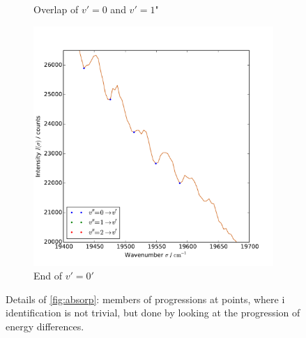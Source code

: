 \begin{figure}
\begin{subfigure}[b]{\picwidth}
        \caption{Overlap of $v'=0$ and $v'=1$"}
        \label{fig:absorp_detail_02}
    \end{subfigure}
    \begin{subfigure}[b]{\picwidth}
        \includegraphics[width=\pltw]{analysis/figures/absorp_03_detail_03.pdf}
        \caption{End of $v'=0'$}
        \label{fig:absorp_detail_03}
    \end{subfigure}
    \caption{Details of \ref{fig:absorp}: members of progressions at points, where i
    identification is not trivial, 
    but done by looking at the progression of energy differences.} 
    \label{fig:absorp_detail}
\end{figure}

